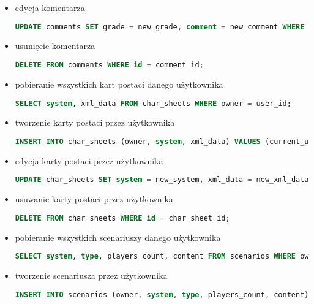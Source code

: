 \begin{itemize}
\item edycja komentarza
\begin{lstlisting}[language=SQL]
UPDATE comments SET grade = new_grade, comment = new_comment WHERE id = comment_id;
\end{lstlisting}

\item usunięcie komentarza
\begin{lstlisting}[language=SQL]
DELETE FROM comments WHERE id = comment_id;
\end{lstlisting}

\item pobieranie wszystkich kart postaci danego użytkownika
\begin{lstlisting}[language=SQL]
SELECT system, xml_data FROM char_sheets WHERE owner = user_id;
\end{lstlisting}

\item tworzenie karty postaci przez użytkownika
\begin{lstlisting}[language=SQL]
INSERT INTO char_sheets (owner, system, xml_data) VALUES (current_user, system_id, xml_data_value);
\end{lstlisting}

\item edycja karty postaci przez użytkownika
\begin{lstlisting}[language=SQL]
UPDATE char_sheets SET system = new_system, xml_data = new_xml_data WHERE id = char_sheet_id;
\end{lstlisting}

\item usuwanie karty postaci przez użytkownika
\begin{lstlisting}[language=SQL]
DELETE FROM char_sheets WHERE id = char_sheet_id;
\end{lstlisting}

\item pobieranie wszystkich scenariuszy danego użytkownika
\begin{lstlisting}[language=SQL]
SELECT system, type, players_count, content FROM scenarios WHERE owner = user_id;
\end{lstlisting}

\clearpage
\item tworzenie scenariusza przez użytkownika
\begin{lstlisting}[language=SQL]
INSERT INTO scenarios (owner, system, type, players_count, content) VALUES (current_user, system_id, type_value, players_count_value, content_value);
\end{lstlisting}


\end{itemize}
